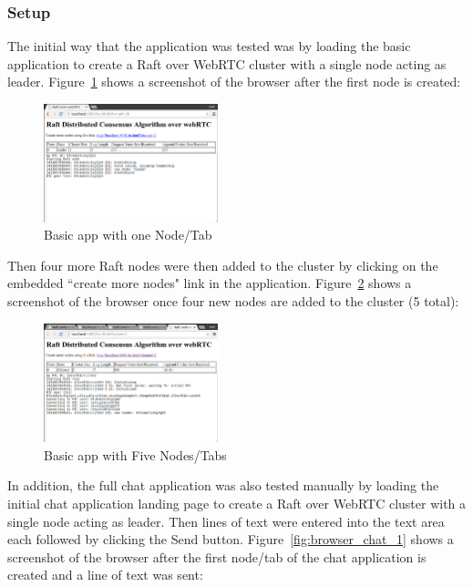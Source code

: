 \documentclass[conference,compsoc]{./IEEEtran/IEEEtran}
\begin{document}
\subsubsection{Setup}

The initial way that the application was tested was by loading the
basic application to create a Raft over WebRTC cluster with a single
node acting as leader. Figure~\ref{fig:browser_1} shows a screenshot
of the browser after the first node is created:

\begin{figure}[!t]
    \centering
    \includegraphics[width=0.45\textwidth]{imgs/browser_1.png}
    \caption{Basic app with one Node/Tab}
    \label{fig:browser_1}
\end{figure}

Then four more Raft nodes were then added to the cluster by clicking
on the embedded ``create more nodes" link in the application.
Figure~\ref{fig:browser_5} shows a screenshot of the browser once four
new nodes are added to the cluster (5 total):

\begin{figure}[!t]
    \centering
    \includegraphics[width=0.45\textwidth]{imgs/browser_5.png}
    \caption{Basic app with Five Nodes/Tabs}
    \label{fig:browser_5}
\end{figure}

In addition, the full chat application was also tested manually by
loading the initial chat application landing page to create a Raft
over WebRTC cluster with a single node acting as leader. Then lines
of text were entered into the text area each followed by clicking the
Send button. Figure~\ref{fig:browser_chat_1} shows a screenshot of the
browser after the first node/tab of the chat application is created
and a line of text was sent:
\end{document}
